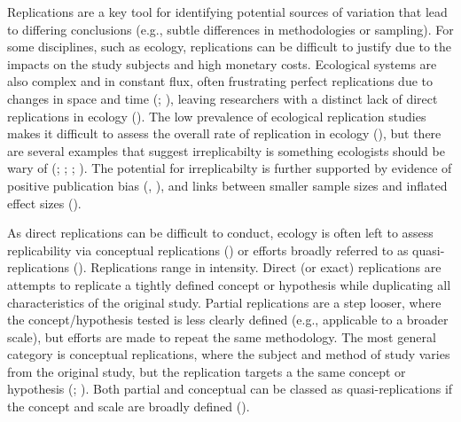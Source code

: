 \documentclass[10pt,a4paper]{article}
\begin{document}
Replications are a key tool for identifying potential sources of variation that lead to differing conclusions (e.g., subtle differences in methodologies or sampling).
For some disciplines, such as ecology, replications can be difficult to justify due to the impacts on the study subjects and high monetary costs.
Ecological systems are also complex and in constant flux, often frustrating perfect replications due to changes in space and time (; ), leaving researchers with a distinct lack of direct replications in ecology ().
The low prevalence of ecological replication studies makes it difficult to assess the overall rate of replication in ecology (), but there are several examples that suggest irreplicabilty is something ecologists should be wary of (; ; ; ).
The potential for irreplicabilty is further supported by evidence of positive publication bias (, ), and links between smaller sample sizes and inflated effect sizes ().

As direct replications can be difficult to conduct, ecology is often left to assess replicability via conceptual replications () or efforts broadly referred to as quasi-replications ().
Replications range in intensity.
Direct (or exact) replications are attempts to replicate a tightly defined concept or hypothesis while duplicating all characteristics of the original study.
Partial replications are a step looser, where the concept/hypothesis tested is less clearly defined (e.g., applicable to a broader scale), but efforts are made to repeat the same methodology.
The most general category is conceptual replications, where the subject and method of study varies from the original study, but the replication targets a the same concept or hypothesis (; ).
Both partial and conceptual can be classed as quasi-replications if the concept and scale are broadly defined ().
\end{document}
